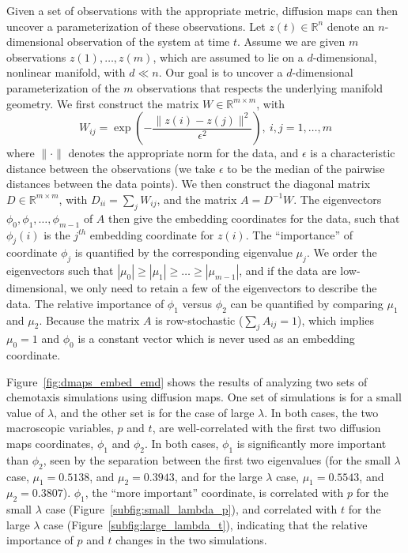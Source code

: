 \documentclass[prl, reprint, final, showkeys]{revtex4-1}
\begin{document}
Given a set of observations with the appropriate metric, diffusion maps can then uncover a parameterization of these observations. 
%
Let $z(t) \in \mathbb{R}^n$ denote an $n$-dimensional observation of the system at time $t$. 
%
Assume we are given $m$ observations $z(1), \dots, z(m)$, which are assumed to lie on a $d$-dimensional, nonlinear manifold, with $d \ll n$. 
%
Our goal is to uncover a $d$-dimensional parameterization of the $m$ observations that respects the underlying manifold geometry.
%
We first construct the matrix $W \in \mathbb{R}^{m \times m}$, with
\begin{equation} \label{eq:W}
W_{ij} = \exp \left( -\frac{\|z(i) - z(j) \|^2}{\epsilon^2} \right), \ i,j=1,\ldots,m
\end{equation}
where $\| \cdot \|$ denotes the appropriate norm for the data, and $\epsilon$ is a characteristic distance between the observations (we take $\epsilon$ to be the median of the pairwise distances between the data points).
%
We then construct the diagonal matrix $D \in \mathbb{R}^{m \times m}$, with $D_{ii} = \sum_j W_{ij}$, and the matrix $A  = D^{-1} W.$
%
The eigenvectors $\phi_0, \phi_1, \dots, \phi_{m-1}$ of $A$ then give the embedding coordinates for the data, such that
$\phi_{j}(i)$ is the $j^{th}$ embedding coordinate for $z(i)$.
%
The ``importance'' of coordinate $\phi_j$ is quantified by the corresponding eigenvalue $\mu_j$.
%
We order the eigenvectors such that $|\mu_0| \ge |\mu_1| \ge \dots \ge |\mu_{m-1}|$, and if the data are low-dimensional, we only need to retain a few of the eigenvectors to describe the data.
%
The relative importance of $\phi_1$ versus $\phi_2$ can be quantified by comparing $\mu_1$ and $\mu_2$.
%
Because the matrix $A$ is row-stochastic ($\sum_j A_{ij} = 1$), which implies $\mu_0 = 1$ and $\phi_0$ is a constant vector which is never used as an embedding coordinate.

Figure~\ref{fig:dmaps_embed_emd} shows the results of analyzing two sets of chemotaxis simulations using diffusion maps. 
%
One set of simulations is for a small value of $\lambda$, and the other set is for the case of large $\lambda$. 
%
In both cases, the two macroscopic variables, $p$ and $t$, are well-correlated with the first two diffusion maps coordinates, $\phi_1$ and $\phi_2$. 
%
In both cases, $\phi_1$ is significantly more important than $\phi_2$, seen by the separation between the first two eigenvalues (for the small $\lambda$ case, $\mu_1 = 0.5138$, and $\mu_2 = 0.3943$, and for the large $\lambda$ case, $\mu_1 = 0.5543$, and $\mu_2 = 0.3807$).
%
$\phi_1$, the ``more important'' coordinate, is correlated with $p$ for the small $\lambda$ case (Figure~\ref{subfig:small_lambda_p}), and correlated with $t$ for the large $\lambda$ case (Figure~\ref{subfig:large_lambda_t}), indicating that the relative importance of $p$ and $t$ changes in the two simulations. 
\end{document}
